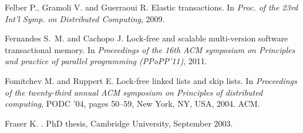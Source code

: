 \begin{thebibliography}{99}
{
Felber P., Gramoli V. and Guerraoui R.
\newblock Elastic transactions.
\newblock In {\em Proc. of the 23rd Int'l Symp. on Distributed Computing},
  2009.

% 
% 
% 







Fernandes S.~M. and Cachopo J.
\newblock Lock-free and scalable multi-version software transactional memory.
\newblock In {\em Proceedings of the 16th ACM symposium on Principles and practice of parallel programming (PPoPP'11)}, 2011.





Fomitchev M. and Ruppert E.
\newblock Lock-free linked lists and skip lists.
\newblock In {\em Proceedings of the twenty-third annual ACM symposium on
  Principles of distributed computing}, PODC '04, pages 50--59, New York, NY,
  USA, 2004. ACM.


Fraser K.
.
\newblock PhD thesis, Cambridge University, September 2003.

}
\end{thebibliography}
